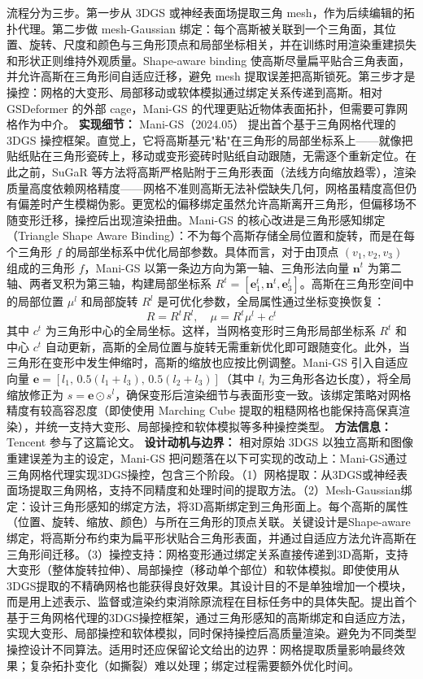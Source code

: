 流程分为三步。第一步从 3DGS 或神经表面场提取三角 mesh，作为后续编辑的拓扑代理。第二步做 mesh-Gaussian 绑定：每个高斯被关联到一个三角面，其位置、旋转、尺度和颜色与三角形顶点和局部坐标相关，并在训练时用渲染重建损失和形状正则维持外观质量。Shape-aware binding 使高斯尽量扁平贴合三角表面，并允许高斯在三角形间自适应迁移，避免 mesh 提取误差把高斯锁死。第三步才是操控：网格的大变形、局部移动或软体模拟通过绑定关系传递到高斯。相对 GSDeformer 的外部 cage，Mani-GS 的代理更贴近物体表面拓扑，但需要可靠网格作为中介。
\textbf{实现细节：} Mani-GS（2024.05） 提出首个基于三角网格代理的 3DGS 操控框架。直觉上，它将高斯基元"粘"在三角形的局部坐标系上——就像把贴纸贴在三角形瓷砖上，移动或变形瓷砖时贴纸自动跟随，无需逐个重新定位。在此之前，SuGaR 等方法将高斯严格贴附于三角形表面（法线方向缩放趋零），渲染质量高度依赖网格精度——网格不准则高斯无法补偿缺失几何，网格虽精度高但仍有偏差时产生模糊伪影。更宽松的偏移绑定虽然允许高斯离开三角形，但偏移场不随变形迁移，操控后出现渲染扭曲。Mani-GS 的核心改进是三角形感知绑定（Triangle Shape Aware Binding）：不为每个高斯存储全局位置和旋转，而是在每个三角形 $f$ 的局部坐标系中优化局部参数。具体而言，对于由顶点 $(v_1, v_2, v_3)$ 组成的三角形 $f$，Mani-GS 以第一条边方向为第一轴、三角形法向量 $\mathbf{n}^t$ 为第二轴、两者叉积为第三轴，构建局部坐标系 $R^t = [\mathbf{e}_1^t, \mathbf{n}^t, \mathbf{e}_3^t]$。高斯在三角形空间中的局部位置 $\mu^l$ 和局部旋转 $R^l$ 是可优化参数，全局属性通过坐标变换恢复： \begin{equation*} R = R^t R^l, \quad \mu = R^t \mu^l + c^t \end{equation*} 其中 $c^t$ 为三角形中心的全局坐标。这样，当网格变形时三角形局部坐标系 $R^t$ 和中心 $c^t$ 自动更新，高斯的全局位置与旋转无需重新优化即可跟随变化。此外，当三角形在变形中发生伸缩时，高斯的缩放也应按比例调整。Mani-GS 引入自适应向量 $\mathbf{e} = [l_1, \, 0.5(l_1+l_3), \, 0.5(l_2+l_3)]$（其中 $l_i$ 为三角形各边长度），将全局缩放修正为 $s = \mathbf{e} \odot s^l$，确保变形后渲染细节与表面形变一致。该绑定策略对网格精度有较高容忍度（即使使用 Marching Cube 提取的粗糙网格也能保持高保真渲染），并统一支持大变形、局部操控和软体模拟等多种操控类型。
\textbf{方法信息：} Tencent 参与了这篇论文。
\textbf{设计动机与边界：} 相对原始 3DGS 以独立高斯和图像重建误差为主的设定，Mani-GS 把问题落在以下可实现的改动上：Mani-GS通过三角网格代理实现3DGS操控，包含三个阶段。（1）网格提取：从3DGS或神经表面场提取三角网格，支持不同精度和处理时间的提取方法。（2）Mesh-Gaussian绑定：设计三角形感知的绑定方法，将3D高斯绑定到三角形面上。每个高斯的属性（位置、旋转、缩放、颜色）与所在三角形的顶点关联。关键设计是Shape-aware绑定，将高斯分布约束为扁平形状贴合三角形表面，并通过自适应方法允许高斯在三角形间迁移。（3）操控支持：网格变形通过绑定关系直接传递到3D高斯，支持大变形（整体旋转拉伸）、局部操控（移动单个部位）和软体模拟。即使使用从3DGS提取的不精确网格也能获得良好效果。其设计目的不是单独增加一个模块，而是用上述表示、监督或渲染约束消除原流程在目标任务中的具体失配。提出首个基于三角网格代理的3DGS操控框架，通过三角形感知的高斯绑定和自适应方法，实现大变形、局部操控和软体模拟，同时保持操控后高质量渲染。避免为不同类型操控设计不同算法。适用时还应保留论文给出的边界：网格提取质量影响最终效果；复杂拓扑变化（如撕裂）难以处理；绑定过程需要额外优化时间。
